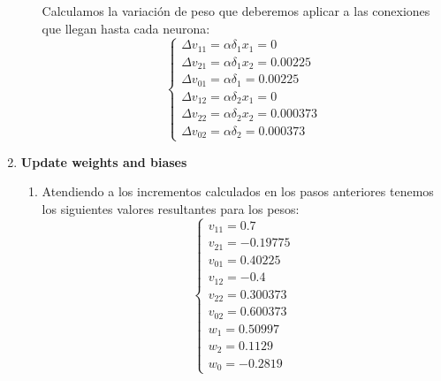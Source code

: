 \begin{problem}[3]
\begin{enumerate}
\begin{enumerate}
Calculamos la variación de peso que deberemos aplicar a las conexiones que llegan hasta cada neurona:
\[\left\{ \begin{array}{l}
Δv_{11}= αδ_1x_1 = 0 \\
Δv_{21}= αδ_1x_2 = 0.00225 \\
Δv_{01}= αδ_1    = 0.00225 \\
Δv_{12}= αδ_2x_1 = 0 \\
Δv_{22}= αδ_2x_2 = 0.000373 \\
Δv_{02}= αδ_2    = 0.000373
\end{array}\right.\]
\end{enumerate}
\item \textbf{Update weights and biases}
\begin{enumerate}
\item Atendiendo a los incrementos calculados en los pasos anteriores tenemos los siguientes valores resultantes para los pesos:
\[\left\{ \begin{array}{l}
v_{11} = 0.7 \\
v_{21} = -0.19775 \\
v_{01} = 0.40225 \\
v_{12} = -0.4 \\
v_{22} = 0.300373 \\
v_{02} = 0.600373 \\
w_1    = 0.50997 \\
w_2    = 0.1129 \\
w_0    = - 0.2819
\end{array}\right.\]
\end{enumerate}
\end{enumerate}
\end{problem}




